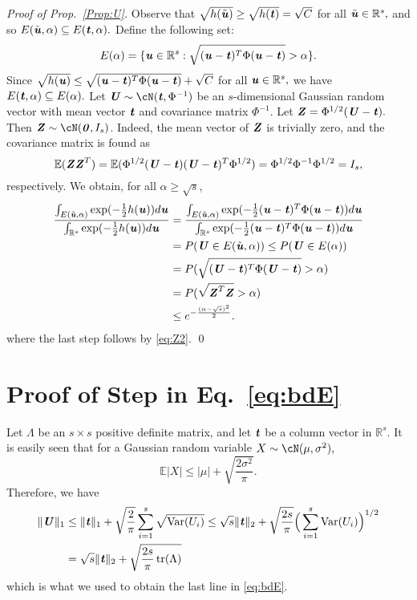 \documentclass[11pt,onecolumn]{IEEEtran}
\def\mathbi#1{{\textbf{\textit #1}}}
\DeclareMathOperator{\tr}{tr}
\DeclareMathOperator{\Var}{Var}
\begin{document}
{\em Proof of Prop.~\ref{Prop:U}.}
Observe that $\sqrt{h(\tilde{\mathbi{u}})} \ge \sqrt{h(\mathbi{t})} = \sqrt{C}$ for all $\tilde{\mathbi{u}} \in \mathbb{R}^s,$
and so $E(\tilde{\mathbi{u}}, \alpha) \subseteq E(\mathbi{t}, \alpha).$ 
Define the following set:
$$
E(\alpha) = \{\mathbi{u} \in \mathbb{R}^s: \sqrt{(\mathbi{u}-\mathbi{t})^T \Phi  (\mathbi{u}-\mathbi{t})} >  \alpha \}.
$$
Since $\sqrt{h(\mathbi{u})} \le \sqrt{(\mathbi{u}-\mathbi{t})^T \Phi  (\mathbi{u}-\mathbi{t})} + \sqrt{C}$
for all $\mathbi{u} \in \mathbb{R}^s,$ we have $E(\mathbi{t}, \alpha) \subseteq E(\alpha).$ 
Let $\mathbi{U} \sim \cN(\mathbi{t}, \Phi^{-1})$ be an $s$-dimensional Gaussian random vector with mean vector $\mathbi{t}$ and covariance matrix $\Phi^{-1}.$ 
Let $\mathbi{Z}=\Phi^{1/2} (\mathbi{U}-\mathbi{t}).$ Then $\mathbi{Z}\sim \cN(\mathbi{0}, I_s)$. Indeed, the mean vector 
of $\mathbi{Z}$ is trivially zero, and the covariance matrix is found as 
$$
\mathbb{E} (\mathbi{Z} \mathbi{Z}^T) = \mathbb{E} (\Phi^{1/2} (\mathbi{U}-\mathbi{t})  (\mathbi{U}-\mathbi{t})^T \Phi^{1/2}) = \Phi^{1/2} \Phi^{-1} \Phi^{1/2} = I_s,
$$
respectively. We obtain, for all $\alpha\ge \sqrt s$,
\begin{align*}
\frac{\int_{E(\tilde{\mathbi{u}}, \alpha)} \exp(-\frac{1}{2}h(\mathbi{u})) d\mathbi{u}}{\int_{ \mathbb{R}^s} \exp(-\frac{1}{2}h(\mathbi{u})) d\mathbi{u}}
 &= \frac{\int_{E(\tilde{\mathbi{u}}, \alpha)} \exp(-\frac{1}{2} (\mathbi{u}-\mathbi{t})^T \Phi  (\mathbi{u}-\mathbi{t})) d\mathbi{u}}{\int_{\mathbb{R}^s} \exp(-\frac{1}{2} (\mathbi{u}-\mathbi{t})^T \Phi  (\mathbi{u}-\mathbi{t})) d\mathbi{u}} \\
 &=  P(\mathbi{U}\in E(\tilde{\mathbi{u}}, \alpha)) 
\le P(\mathbi{U}\in E(\alpha))\\
&=  P (\sqrt{(\mathbi{U}-\mathbi{t})^T \Phi  (\mathbi{U}-\mathbi{t})} >  \alpha) \\
&=  P (\sqrt{\mathbi{Z}^T \mathbi{Z}} > \alpha)\\
&\le  e^{-\frac{(\alpha-\sqrt{s})^2}{2}}.
\end{align*}
where the last step follows by \eqref{eq:Z2}. \qed

\section{Proof of Step  in Eq.~\eqref{eq:bdE}}\label{ap:Gauss}

Let $\Lambda$ be an $s\times s$ positive definite matrix, and let $\mathbi{t}$ be a column vector in $\mathbb{R}^s.$
It is easily seen that for a Gaussian random variable $X\sim \cN(\mu, \sigma^2),$
$$
\mathbb{E}|X| \le |\mu| + \sqrt{\frac{2 \sigma^2}{\pi}} .
$$
Therefore, we have
\begin{align*}
\|\mathbi{U}\|_1 &\le \|\mathbi{t}\|_1 + \sqrt{\frac{2}{\pi}} \sum_{i=1}^s \sqrt{\Var(U_i)} \le \sqrt{s} \|\mathbi{t}\|_2 + \sqrt{\frac{2s}{\pi}} \Big(\sum_{i=1}^s \Var(U_i) \Big)^{1/2} \\
& = \sqrt{s} \|\mathbi{t}\|_2 + \sqrt{\frac{2s}{\pi} \tr(\Lambda)}
\end{align*}
which is what we used to obtain the last line in \eqref{eq:bdE}.
\end{document}
